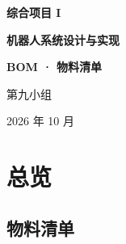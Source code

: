 \documentclass[11pt,a4paper]{article}
\begin{document}

\begin{titlepage}
  \centering
  \vspace*{3.2cm}
  {\Huge\bfseries 综合项目 I\par}
  \vspace{0.2cm}
  {\Huge\bfseries 机器人系统设计与实现\par}
  \vspace{0.5cm}
  {\Huge\bfseries BOM · \hspace{1pt} 物料清单\par}
  \vspace{0.8cm}
  \vfill
  {\large 第九小组\par}
  \vspace{0.3cm}
  {\large 2026 年 10 月\par}
  \vspace{1.5cm}
\end{titlepage}

\tableofcontents
\clearpage
{}

\section{总览}

\subsection{物料清单}
\end{document}
